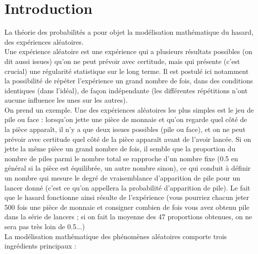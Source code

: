 \documentclass[12pt,a4paper]{report}
\begin{document}
\newcommand{\p}{\mathbb{P}}
\newcommand{\E}{\mathbb{E}}
\newcommand{\cov}{\text{cov}}

\section*{Introduction}

La théorie des probabilités a pour objet la modélisation mathématique du hasard, des expériences aléatoires. \\
Une expérience aléatoire est une expérience qui a plusieurs résultats possibles (on dit aussi issues) qu'on ne peut prévoir avec certitude, mais qui présente (c'est 
crucial) une régularité statistique sur le long terme. Il est postulé ici notamment la possibilité de répéter l'expérience un grand nombre de fois, dans des 
conditions identiques (dans l'idéal), de façon indépendante (les différentes répétitions n'ont aucune influence les unes sur les autres). \\
On prend un exemple. Une des expériences aléatoires les plus simples est le jeu de pile ou face : lorsqu'on jette une pièce de monnaie et qu'on regarde quel côté de 
la pièce apparaît, il n'y a que deux issues possibles (pile ou face), et on ne peut prévoir avec certitude quel côté de la pièce apparaît avant de l'avoir lancée. Si 
on jette la même pièce un grand nombre de fois, il semble que la proportion du nombre de piles parmi le nombre total se rapproche d'un nombre fixe (0.5 en général si 
la pièce est équilibrée, un autre nombre sinon), ce qui conduit à définir un nombre qui mesure le degré de vraisemblance d'apparition de pile pour un lancer donné 
(c'est ce qu'on appellera la probabilité d'apparition de pile). Le fait que le hasard fonctionne ainsi résulte de l'expérience (vous pourriez chacun jeter 500 fois 
une pièce de monnaie et consigner combien de fois vous avez obtenu pile dans la série de lancers ; si on fait la moyenne des 47 proportions obtenues, on ne sera pas 
très loin de 0.5...) \\
La modélisation mathématique des phénomènes aléatoires comporte trois ingrédients principaux : 
\end{document}
